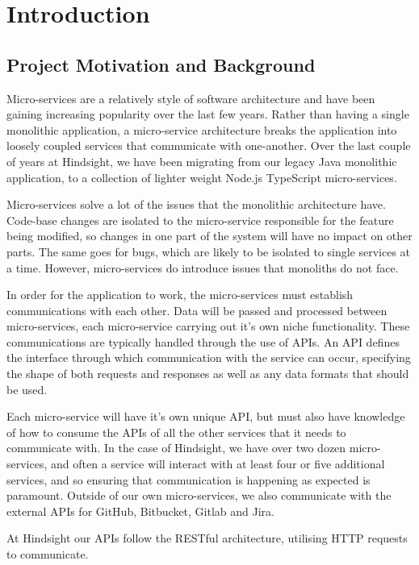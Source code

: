 \chapter{Introduction}
\section{Project Motivation and Background}

Micro-services are a relatively style of software architecture and have been gaining increasing popularity over the last few years. Rather than having a single monolithic application, a micro-service architecture breaks the application into loosely coupled services that communicate with one-another. Over the last couple of years at Hindsight, we have been migrating from our legacy Java monolithic application, to a collection of lighter weight Node.js TypeScript micro-services.

Micro-services solve a lot of the issues that the monolithic architecture have. Code-base changes are isolated to the micro-service responsible for the feature being modified, so changes in one part of the system will have no impact on other parts. The same goes for bugs, which are likely to be isolated to single services at a time. However, micro-services do introduce issues that monoliths do not face.

In order for the application to work, the micro-services must establish communications with each other. Data will be passed and processed between micro-services, each micro-service carrying out it's own niche functionality. These communications are typically handled through the use of APIs. An API defines the interface through which communication with the service can occur, specifying the shape of both requests and responses as well as any data formats that should be used.

Each micro-service will have it's own unique API, but must also have knowledge of how to consume the APIs of all the other services that it needs to communicate with. In the case of Hindsight, we have over two dozen micro-services, and often a service will interact with at least four or five additional services, and so ensuring that communication is happening as expected is paramount. Outside of our own micro-services, we also communicate with the external APIs for GitHub, Bitbucket, Gitlab and Jira.

At Hindsight our APIs follow the RESTful architecture, utilising HTTP requests to communicate.

